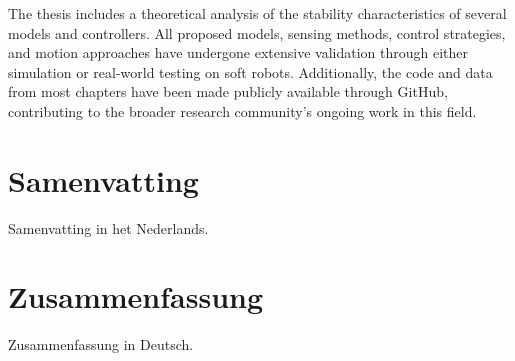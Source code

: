 The thesis includes a theoretical analysis of the stability characteristics of several models and controllers. All proposed models, sensing methods, control strategies, and motion approaches have undergone extensive validation through either simulation or real-world testing on soft robots. Additionally, the code and data from most chapters have been made publicly available through GitHub, contributing to the broader research community's ongoing work in this field.


\chapter*{Samenvatting}

{

  Samenvatting in het Nederlands.
}

\chapter*{Zusammenfassung}

{

  Zusammenfassung in Deutsch.
}



